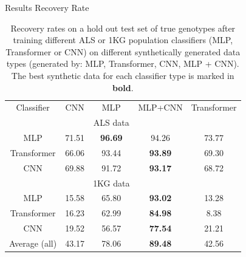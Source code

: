 \documentclass[compress, aspectratio=169]{beamer}
\begin{document}
\begin{frame}{Results Recovery Rate}


\begin{table}[ht!]
  \centering
  \caption{Recovery rates on a hold out test set of true genotypes after training different ALS or 1KG population classifiers (MLP, Transformer or CNN)  on different synthetically generated data types (generated by: MLP, Transformer, CNN, MLP + CNN). The best synthetic data for each classifier type is marked in \textbf{bold}.}
  \label{Fig:cls}
  \begin{tabular}{c|cccc}
    \toprule
Classifier & CNN  & MLP  & MLP+CNN & Transformer \\ %
 
   \cmidrule(r){1-5} 
  & & ALS data  \\
MLP &   71.51 & \textbf{96.69} & 94.26 & 73.77 \\
Transformer &  66.06 & 93.44 & \textbf{93.89} & 69.30 \\
CNN & 69.88 & 91.72 & \textbf{93.17} & 68.72 \\
\cmidrule(r){1-5} 
& &1KG data \\
 MLP &   15.58 & 65.80 & \textbf{93.02} & 13.28 \\
  Transformer &  16.23 & 62.99 & \textbf{84.98} & 8.38 \\
 CNN &   19.52 & 56.57 & \textbf{77.54} & 21.21 \\
\cmidrule(r){1-5} 
 Average (all) & 43.17 & 78.06 & \textbf{89.48} & 42.56\\
    \bottomrule
  \end{tabular}
\end{table}
    
\end{frame}
\end{document}
